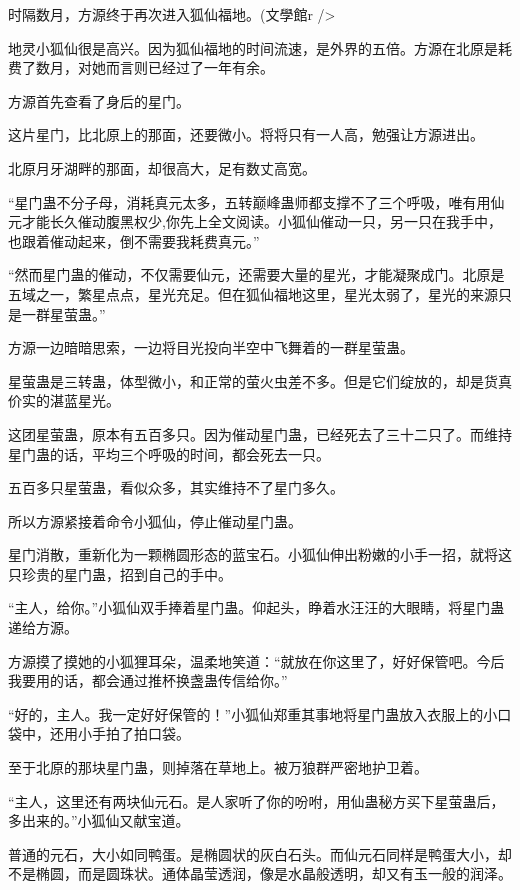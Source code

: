 
\begin{this_body}

时隔数月，方源终于再次进入狐仙福地。(文學館r />

地灵小狐仙很是高兴。因为狐仙福地的时间流速，是外界的五倍。方源在北原是耗费了数月，对她而言则已经过了一年有余。

方源首先查看了身后的星门。

这片星门，比北原上的那面，还要微小。将将只有一人高，勉强让方源进出。

北原月牙湖畔的那面，却很高大，足有数丈高宽。

“星门蛊不分子母，消耗真元太多，五转巅峰蛊师都支撑不了三个呼吸，唯有用仙元才能长久催动腹黑权少,你先上全文阅读。小狐仙催动一只，另一只在我手中，也跟着催动起来，倒不需要我耗费真元。”

“然而星门蛊的催动，不仅需要仙元，还需要大量的星光，才能凝聚成门。北原是五域之一，繁星点点，星光充足。但在狐仙福地这里，星光太弱了，星光的来源只是一群星萤蛊。”

方源一边暗暗思索，一边将目光投向半空中飞舞着的一群星萤蛊。

星萤蛊是三转蛊，体型微小，和正常的萤火虫差不多。但是它们绽放的，却是货真价实的湛蓝星光。

这团星萤蛊，原本有五百多只。因为催动星门蛊，已经死去了三十二只了。而维持星门蛊的话，平均三个呼吸的时间，都会死去一只。

五百多只星萤蛊，看似众多，其实维持不了星门多久。

所以方源紧接着命令小狐仙，停止催动星门蛊。

星门消散，重新化为一颗椭圆形态的蓝宝石。小狐仙伸出粉嫩的小手一招，就将这只珍贵的星门蛊，招到自己的手中。

“主人，给你。”小狐仙双手捧着星门蛊。仰起头，睁着水汪汪的大眼睛，将星门蛊递给方源。

方源摸了摸她的小狐狸耳朵，温柔地笑道：“就放在你这里了，好好保管吧。今后我要用的话，都会通过推杯换盏蛊传信给你。”

“好的，主人。我一定好好保管的！”小狐仙郑重其事地将星门蛊放入衣服上的小口袋中，还用小手拍了拍口袋。

至于北原的那块星门蛊，则掉落在草地上。被万狼群严密地护卫着。

“主人，这里还有两块仙元石。是人家听了你的吩咐，用仙蛊秘方买下星萤蛊后，多出来的。”小狐仙又献宝道。

普通的元石，大小如同鸭蛋。是椭圆状的灰白石头。而仙元石同样是鸭蛋大小，却不是椭圆，而是圆珠状。通体晶莹透润，像是水晶般透明，却又有玉一般的润泽。


\end{this_body}
